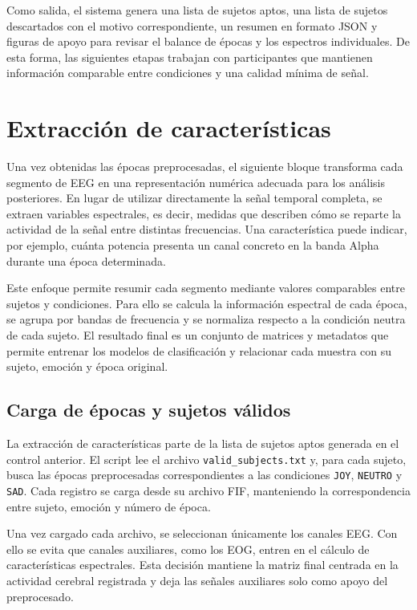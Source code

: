 Como salida, el sistema genera una lista de sujetos aptos, una lista de sujetos descartados con el motivo correspondiente, un resumen en formato \ac{JSON} y figuras de apoyo para revisar el balance de épocas y los espectros individuales. De esta forma, las siguientes etapas trabajan con participantes que mantienen información comparable entre condiciones y una calidad mínima de señal.



\section{Extracción de características}

Una vez obtenidas las épocas preprocesadas, el siguiente bloque transforma cada segmento de \ac{EEG} en una representación numérica adecuada para los análisis posteriores. En lugar de utilizar directamente la señal temporal completa, se extraen variables espectrales, es decir, medidas que describen cómo se reparte la actividad de la señal entre distintas frecuencias. Una característica puede indicar, por ejemplo, cuánta potencia presenta un canal concreto en la banda Alpha durante una época determinada.

Este enfoque permite resumir cada segmento mediante valores comparables entre sujetos y condiciones. Para ello se calcula la información espectral de cada época, se agrupa por bandas de frecuencia y se normaliza respecto a la condición neutra de cada sujeto. El resultado final es un conjunto de matrices y metadatos que permite entrenar los modelos de clasificación y relacionar cada muestra con su sujeto, emoción y época original.


\subsection{Carga de épocas y sujetos válidos}

La extracción de características parte de la lista de sujetos aptos generada en el control anterior. El script lee el archivo \texttt{valid\_subjects.txt} y, para cada sujeto, busca las épocas preprocesadas correspondientes a las condiciones \texttt{JOY}, \texttt{NEUTRO} y \texttt{SAD}. Cada registro se carga desde su archivo \ac{FIF}, manteniendo la correspondencia entre sujeto, emoción y número de época.

Una vez cargado cada archivo, se seleccionan únicamente los canales \ac{EEG}. Con ello se evita que canales auxiliares, como los \ac{EOG}, entren en el cálculo de características espectrales. Esta decisión mantiene la matriz final centrada en la actividad cerebral registrada y deja las señales auxiliares solo como apoyo del preprocesado.


